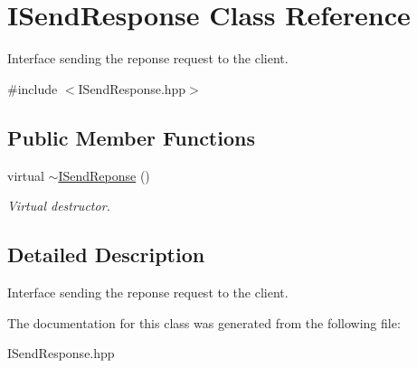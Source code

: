 \hypertarget{class_i_send_response}{}\section{I\+Send\+Response Class Reference}
\label{class_i_send_response}


Interface sending the reponse request to the client.  




{\ttfamily \#include $<$I\+Send\+Response.\+hpp$>$}

\subsection*{Public Member Functions}
\begin{DoxyCompactItemize}
\item 
\hypertarget{class_i_send_response_ac9d4776579b47bf2a992576d49400d8f}{}virtual \hyperlink{class_i_send_response_ac9d4776579b47bf2a992576d49400d8f}{$\sim$\+I\+Send\+Reponse} ()\label{class_i_send_response_ac9d4776579b47bf2a992576d49400d8f}

\begin{DoxyCompactList}\small\item\em Virtual destructor. \end{DoxyCompactList}\end{DoxyCompactItemize}


\subsection{Detailed Description}
Interface sending the reponse request to the client. 

The documentation for this class was generated from the following file\+:\begin{DoxyCompactItemize}
\item 
I\+Send\+Response.\+hpp\end{DoxyCompactItemize}
